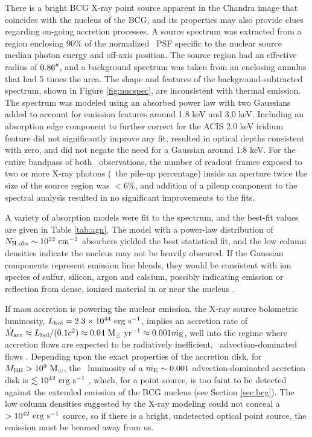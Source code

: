 \documentclass[apjpt4]{aastex}
\begin{document}
There is a bright BCG X-ray point source apparent in the Chandra image
that coincides with the nucleus of the BCG, and its properties may
also provide clues regarding on-going accretion processes. A source
spectrum was extracted from a region enclosing 90\% of the normalized
\cxo\ PSF specific to the nuclear source median photon energy and
off-axis position. The source region had an effective radius of
$0.86\rm{^\prime}\hskip -0.1em\rm{^\prime}$, and a background spectrum was taken from an enclosing
annulus that had 5 times the area. The shape and features of the
background-subtracted spectrum, shown in Figure \ref{fig:nucspec}, are
inconsistent with thermal emission. The spectrum was modeled using an
absorbed power law with two Gaussians added to account for emission
features around 1.8 keV and 3.0 keV. Including an absorption edge
component to further correct for the ACIS 2.0 keV iridium feature did
not significantly improve any fit, resulted in optical depths
consistent with zero, and did not negate the need for a Gaussian
around 1.8 keV. For the entire bandpass of both \cxo\ observations,
the number of readout frames exposed to two or more X-ray photons
(\ie\ the pile-up percentage) inside an aperture twice the size of the
source region was $< 6\%$, and addition of a pileup component to the
spectral analysis resulted in no significant improvements to the fits.

A variety of absorption models were fit to the spectrum, and the
best-fit values are given in Table \ref{tab:agn}. The model with a
power-law distribution of $N_{\rm{H,obs}} \sim 10^{22} ~\mbox{\ensuremath{\rm{cm^{-2}}}}$ absorbers
yielded the best statistical fit, and the low column densities
indicate the nucleus may not be heavily obscured. If the Gaussian
components represent emission line blends, they would be consistent
with ion species of sulfur, silicon, argon and calcium, possibly
indicating emission or reflection from dense, ionized material in or
near the nucleus \citep[\eg][]{1990ApJ...362...90B,
  1998MNRAS.297.1219I}.

If mass accretion is powering the nuclear emission, the X-ray source
bolometric luminosity, $L_{\rm{bol}} = 2.3 \times 10^{44} ~\rm{\mbox{\ensuremath{\rm{erg}}}~\ensuremath{\rm{\mbox{\ensuremath{\rm{s}}}^{-1}}}}$, implies an
accretion rate of $\dot{M}_{\rm{acc}} \approx L_{\rm{bol}}/(0.1 c^2) \approx 0.04
~\mbox{\ensuremath{\rm{M_{\odot}}~\rm{\mbox{\ensuremath{\rm{yr}}}^{-1}}}} \approx 0.001 \dot{m_{\rm{E}}}$, well into the regime where accretion
flows are expected to be radiatively inefficient,
\eg\ advection-dominated flows \citep{adaf}. Depending upon the exact
properties of the accretion disk, for $M_{\rm{BH}} > 10^9 ~\rm{M_{\odot}}$, the
\hbeta\ luminosity of a $\dot{m_{\rm{E}}} \sim 0.001$ advection-dominated
accretion disk is $\lesssim 10^{42} ~\rm{\mbox{\ensuremath{\rm{erg}}}~\ensuremath{\rm{\mbox{\ensuremath{\rm{s}}}^{-1}}}}$ \citep{2002ApJ...570L..13C},
which, for a point source, is too faint to be detected against the
extended emission of the BCG nucleus (see Section \ref{sec:bcg}). The
low column densities suggested by the X-ray modeling could not conceal
a $> 10^{42} ~\rm{\mbox{\ensuremath{\rm{erg}}}~\ensuremath{\rm{\mbox{\ensuremath{\rm{s}}}^{-1}}}}$ source, so if there is a bright, undetected
optical point source, the emission must be beamed away from us.
\end{document}

